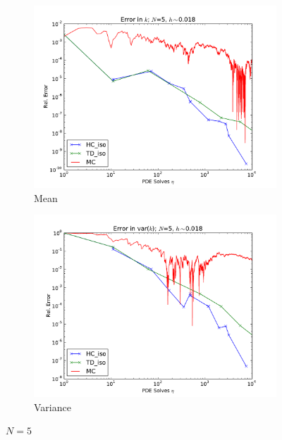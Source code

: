 \documentclass[11pt]{article}
\begin{document}
\begin{figure}[H]
\centering
  \begin{subfigure}[b]{0.49 \textwidth}
   \includegraphics[width=\textwidth]{N5_h5_MCHC}
   \caption{Mean}
   \label{n5mean}
  \end{subfigure}
  \begin{subfigure}[b]{0.49 \textwidth}
   \includegraphics[width=\textwidth]{N5_h5_MCHC_2}
   \caption{Variance}
   \label{n5var}
  \end{subfigure}
  \caption{$N=5$}
  \label{n5}
\end{figure}
\end{document}
